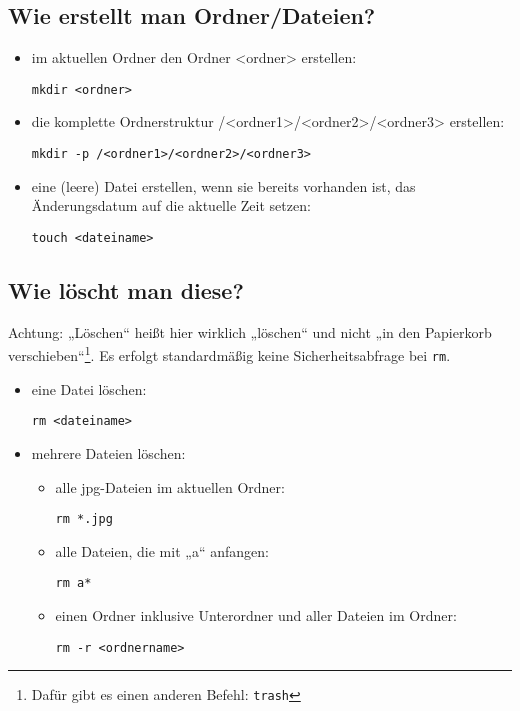 \documentclass[a4paper,12pt]{article}
\begin{document}
\subsection{Wie erstellt man Ordner/Dateien?}
\begin{itemize}
\item im aktuellen Ordner den Ordner <ordner> erstellen: 
\begin{lstlisting}
mkdir <ordner>
\end{lstlisting} 
\item die komplette Ordnerstruktur /<ordner1>/<ordner2>/<ordner3> erstellen: 
\begin{lstlisting}
mkdir -p /<ordner1>/<ordner2>/<ordner3>
\end{lstlisting} 
\item eine (leere) Datei erstellen, wenn sie bereits vorhanden ist, 
das Änderungsdatum auf die aktuelle Zeit setzen: 
\begin{lstlisting}
touch <dateiname>
\end{lstlisting} 
\end{itemize}

\subsection{Wie löscht man diese?}

Achtung: „Löschen“ heißt hier wirklich „löschen“ und nicht „in den Papierkorb verschieben“\footnote{Dafür gibt es einen anderen Befehl: \texttt{trash}}. Es erfolgt standardmäßig keine Sicherheitsabfrage bei \texttt{rm}.

\begin{itemize}
\item eine Datei löschen: 
\begin{lstlisting}
rm <dateiname>
\end{lstlisting} 
\item mehrere Dateien löschen:
\begin{itemize}
\item alle jpg-Dateien im aktuellen Ordner: 
\begin{lstlisting}
rm *.jpg
\end{lstlisting} 
\item alle Dateien, die mit „a“ anfangen: 
\begin{lstlisting}
rm a*
\end{lstlisting} 
\item einen Ordner inklusive Unterordner und aller Dateien im Ordner: 
\begin{lstlisting}
rm -r <ordnername>
\end{lstlisting} 
\end{itemize}
\end{itemize}
\end{document}
